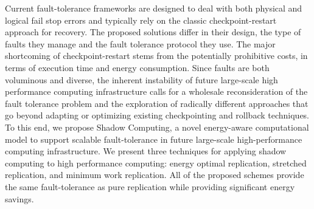 Current fault-tolerance frameworks are designed to deal with both
physical and logical fail stop errors and typically rely on the
classic checkpoint-restart approach for recovery. The proposed
solutions differ in their design, the type of faults they manage and
the fault tolerance protocol they use.  The major shortcoming of
checkpoint-restart stems from the potentially prohibitive costs, in
terms of execution time and energy consumption. Since faults are both
voluminous and diverse, the inherent instability of future large-scale
high performance computing infrastructure calls for a wholesale
reconsideration of the fault tolerance problem and the exploration of
radically different approaches that go beyond adapting or optimizing
existing checkpointing and rollback techniques. To this end, we
propose Shadow Computing, a novel energy-aware computational model to
support scalable fault-tolerance in future large-scale
high-performance computing infrastructure. We present three techniques
for applying shadow computing to high performance computing: energy
optimal replication, stretched replication, and minimum work
replication. All of the proposed schemes provide the same
fault-tolerance as pure replication while providing significant energy
savings.

